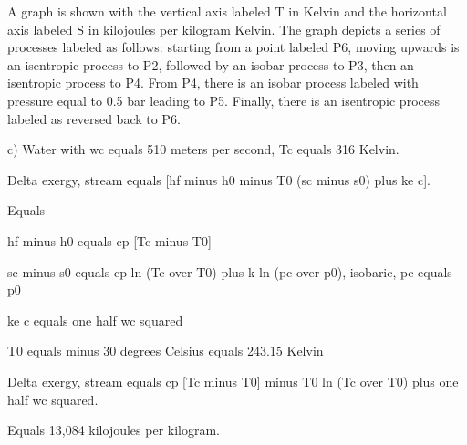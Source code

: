 A graph is shown with the vertical axis labeled T in Kelvin and the horizontal axis labeled S in kilojoules per kilogram Kelvin. The graph depicts a series of processes labeled as follows: starting from a point labeled P6, moving upwards is an isentropic process to P2, followed by an isobar process to P3, then an isentropic process to P4. From P4, there is an isobar process labeled with pressure equal to 0.5 bar leading to P5. Finally, there is an isentropic process labeled as reversed back to P6.

c) Water with wc equals 510 meters per second, Tc equals 316 Kelvin.

Delta exergy, stream equals [hf minus h0 minus T0 (sc minus s0) plus ke c].

Equals

hf minus h0 equals cp [Tc minus T0]

sc minus s0 equals cp ln (Tc over T0) plus k ln (pc over p0), isobaric, pc equals p0

ke c equals one half wc squared

T0 equals minus 30 degrees Celsius equals 243.15 Kelvin

Delta exergy, stream equals cp [Tc minus T0] minus T0 ln (Tc over T0) plus one half wc squared.

Equals 13,084 kilojoules per kilogram.